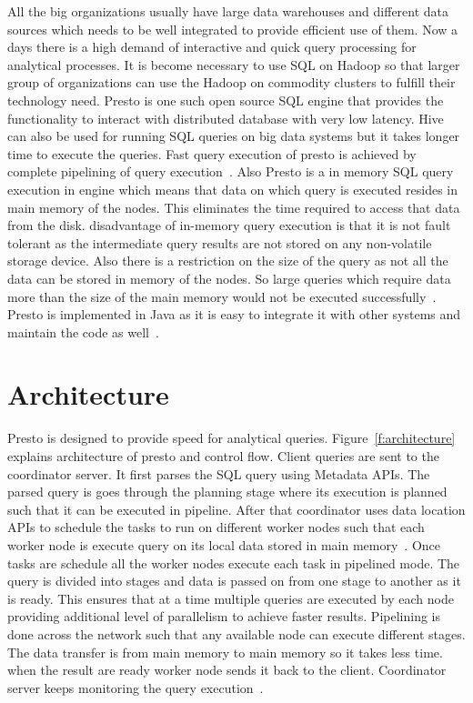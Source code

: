 All the big organizations usually have large data warehouses and different data
sources which needs to be well integrated to provide efficient use of them. Now
a days there is a high demand of interactive and quick query processing for
analytical processes. It is become necessary to use SQL on Hadoop so that
larger group of organizations can use the Hadoop on commodity clusters to
fulfill their technology need. Presto is one such open source SQL engine that
provides the functionality to interact with distributed database with very
low latency.
Hive can also be used for running SQL queries on big data systems but it takes
longer time to execute the queries. Fast query execution of presto is achieved
by complete pipelining of query
execution~\cite{hid-sp18-502-presto-architecture}. Also Presto is a in memory
SQL query execution in engine which means that data on which query is executed
resides in main memory of the nodes. This eliminates the time required to access
 that data from the disk. disadvantage of in-memory query execution is that it
 is not fault tolerant as the intermediate query results are not stored on any
non-volatile storage device. Also there is a restriction on the size of the
query as not all the data can be stored in memory of the nodes. So large
queries which require data more than the size of the main memory would not be
executed successfully~\cite{hid-sp18-502-presto-compare}.
Presto is implemented in Java as it is easy to integrate it with other systems
and maintain the code as well~\cite{hid-sp18-502-presto-architecture}.

\section{Architecture}

Presto is designed to provide speed for analytical queries.
Figure~\ref{f:architecture} explains architecture of presto and control flow.
Client queries are sent to the coordinator server. It first parses the SQL query
 using Metadata APIs. The parsed query is goes through the planning stage where
 its execution is planned such that it can be executed in pipeline. After that
 coordinator uses data location APIs to schedule the tasks to run on different
 worker nodes such that each worker node is execute query on its local data
 stored in main memory~\cite{hid-sp18-502-presto-architecture}. Once tasks are
 schedule all the worker nodes execute each task in pipelined mode. The query is
 divided into stages and data is passed on from one stage to another as it is
 ready. This ensures that at a time multiple queries are executed by each node
 providing additional level of parallelism to achieve faster results. Pipelining
 is done across the network such that any available node can execute different
 stages. The data transfer is from main memory to main memory so it takes less
 time. when the result are ready worker node sends it back to the client.
 Coordinator server keeps monitoring the query
 execution~\cite{hid-sp18-502-presto-architecture}.

